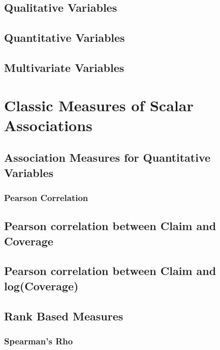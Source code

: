 \documentclass[]{book}
\theoremstyle{definition}
\theoremstyle{definition}
\theoremstyle{definition}
\theoremstyle{remark}
\begin{document}
\subsection{Qualitative Variables}\label{S:QuaVar}

\subsection{Quantitative Variables}\label{S:QuanVar}

\subsection{Multivariate Variables}\label{multivariate-variables}

\section{Classic Measures of Scalar Associations}\label{S:Measures}

\subsection{Association Measures for Quantitative
Variables}\label{association-measures-for-quantitative-variables}

\subsubsection{Pearson Correlation}\label{pearson-correlation}

\subsection{Pearson correlation between Claim and
Coverage}\label{pearson-correlation-between-claim-and-coverage}

\subsection{Pearson correlation between Claim and
log(Coverage)}\label{pearson-correlation-between-claim-and-logcoverage}

\subsection{Rank Based Measures}\label{rank-based-measures}

\subsubsection{Spearman's Rho}\label{spearmans-rho}
\end{document}
